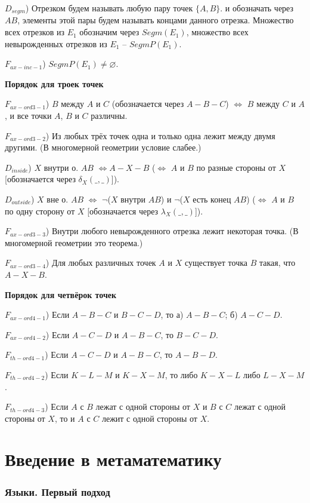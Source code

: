 \documentclass[a4paper]{article}
\begin{document}
$D_{segm}$) Отрезком будем называть любую пару точек $\{A, B\}$. и обозначать через $AB$, элементы этой пары будем называть концами данного отрезка. Множество всех отрезков из $E_1$ обозначим через $Segm(E_1)$, множество всех невырожденных отрезков из $E_1$ -- $SegmP(E_1)$.

$F_{ax-inc-1}$) $SegmP(E_1) \neq \varnothing$.

\textbf{Порядок для троек точек}

$F_{ax-ord3-1}$) $B$ между $A$ и $C$ (обозначается через $A-B-C$) $\Leftrightarrow$ $B$ между $C$ и $A$, и все точки $A$, $B$ и $C$ различны.

$F_{ax-ord3-2}$) Из любых трёх точек одна и только одна лежит между двумя другими. (В многомерной геометрии условие слабее.)

$D_{inside}$) $X$ внутри о. $AB$ $\Leftrightarrow A-X-B$ ($\Leftrightarrow$ $A$ и $B$ по разные стороны от $X$ [обозначается через $\delta_X(\_,\_)$]).

$D_{outside}$) $X$ вне о. $AB$ $\Leftrightarrow$ $\neg$($X$ внутри $AB$) и $\neg$($X$ есть конец $AB$) ($\Leftrightarrow$ $A$ и $B$ по одну сторону от $X$ [обозначается через $\lambda_X(\_,\_)$]).

$F_{ax-ord3-3}$) Внутри любого невырожденного отрезка лежит некоторая точка. (В многомерной геометрии это теорема.)

$F_{ax-ord3-4}$) Для любых различных точек $A$ и $X$ существует точка $B$ такая, что $A-X-B$.

\textbf{Порядок для четвёрок точек}

$F_{ax-ord4-1}$) Если $A-B-C$ и $B-C-D$, то а) $A-B-C$; б) $A-C-D$.

$F_{ax-ord4-2}$) Если $A-C-D$ и $A-B-C$, то $B-C-D$.

$F_{th-ord4-1}$) Если $A-C-D$ и $A-B-C$, то $A-B-D$.

$F_{th-ord4-2}$) Если $K-L-M$ и $K-X-M$, то либо $K-X-L$ либо $L-X-M$.

$F_{th-ord4-3}$) Если $A$ с $B$ лежат с одной стороны от $X$ и $B$ с $C$ лежат с одной стороны от $X$, то и $A$ с $C$ лежит с одной стороны от $X$.

\clearpage

\part{Введение в метаматематику}

\section{Языки. Первый подход}
\end{document}
